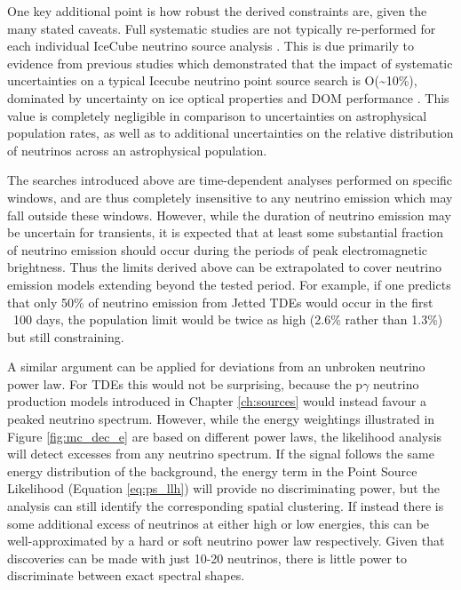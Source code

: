 One key additional point is how robust the derived constraints are, given the many stated caveats. Full systematic studies are not typically re-performed for each individual IceCube neutrino source analysis . This is due primarily to evidence from previous studies which demonstrated that the impact of systematic uncertainties on a typical Icecube neutrino point source search is O(\sim10\%), dominated by uncertainty on ice optical properties and DOM performance  . This value is completely negligible in comparison to uncertainties on astrophysical population rates, as well as to additional uncertainties on the relative distribution of neutrinos across an astrophysical population. 

The searches introduced above are time-dependent analyses performed on specific windows, and are thus completely insensitive to any neutrino emission which may fall outside these windows. However, while the duration of neutrino emission may be uncertain for transients, it is expected that at least some substantial fraction of neutrino emission should occur during the periods of peak electromagnetic brightness. Thus the limits derived above can be extrapolated to cover neutrino emission models extending beyond the tested period. For example, if one predicts that only 50\% of neutrino emission from Jetted TDEs would occur in the first ~100 days, the population limit would be twice as high (2.6\% rather than 1.3\%) but still constraining.

A similar argument can be applied for deviations from an unbroken neutrino power law. For TDEs this would not be surprising, because the p$\gamma$ neutrino production models introduced in Chapter \ref{ch:sources} would instead favour a peaked neutrino spectrum. However, while the energy weightings illustrated in Figure \ref{fig:mc_dec_e} are based on different power laws, the likelihood analysis will detect excesses from any neutrino spectrum. If the signal follows the same energy distribution of the background, the energy term in the Point Source Likelihood (Equation \ref{eq:ps_llh}) will provide no discriminating power, but the analysis can still identify the corresponding spatial clustering. If instead there is some additional excess of neutrinos at either high or low energies, this can be well-approximated by a hard or soft neutrino power law respectively. Given that discoveries can be made with just 10-20 neutrinos, there is little power to discriminate between exact spectral shapes. 


